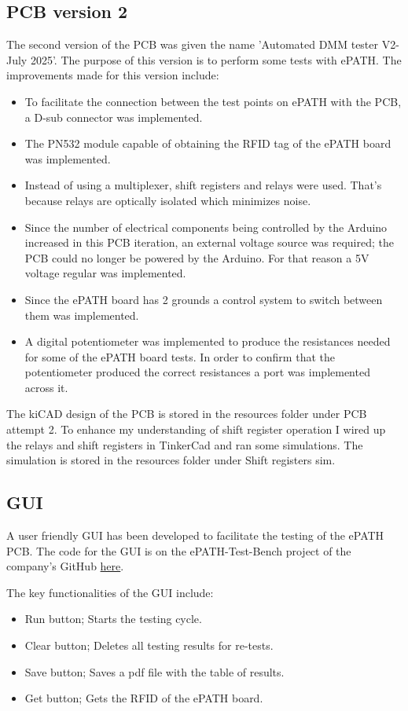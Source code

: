 \subsection{PCB version 2}
The second version of the PCB was given the name 'Automated DMM tester V2-July 2025'. The purpose of this version is to perform some tests with ePATH. The improvements made for this version include:
\begin{itemize}
\item To facilitate the connection between the test points on ePATH with the PCB, a D-sub connector was implemented.
\item The PN532 module capable of obtaining the RFID tag of the ePATH board \cite{pn532manual} was implemented.
\item Instead of using a multiplexer, shift registers and relays were used. That's because relays are optically isolated which minimizes noise. 
\item Since the number of electrical components being controlled by the Arduino increased in this PCB iteration, an external voltage source was required; the PCB could no longer be powered by the Arduino. For that reason a 5V voltage regular was implemented.
\item Since the ePATH board has 2 grounds a control system to switch between them was implemented.
\item A digital potentiometer was implemented to produce the resistances needed for some of the ePATH board tests. In order to confirm that the potentiometer produced the correct resistances a port was implemented across it.
\end{itemize}

The kiCAD design of the PCB is stored in the resources folder under PCB attempt 2. To enhance my understanding of shift register operation I wired up the relays and shift registers in TinkerCad and ran some simulations. The simulation is stored in the resources folder under Shift registers sim.



\subsection{GUI}
A user friendly GUI has been developed to facilitate the testing of the ePATH PCB. The code for the GUI is on the ePATH-Test-Bench project of the company's GitHub \href{https://github.com/pathfinder-medical/ePATH-Test-Bench}{here}.

The key functionalities of the GUI include:
\begin{itemize}
\item Run button; Starts the testing cycle.
\item Clear button; Deletes all testing results for re-tests.
\item Save button; Saves a pdf file with the table of results.
\item Get button; Gets the RFID of the ePATH board.
\end{itemize}
